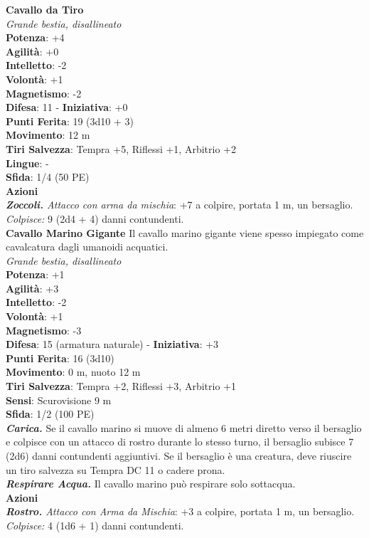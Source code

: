 \begin{multicols}{2}
\medskip\textbf{Cavallo da Tiro}\\
\emph{Grande bestia, disallineato}\\
\textbf{Potenza}: +4\\
\textbf{Agilità}: +0\\
\textbf{Intelletto}: -2\\
\textbf{Volontà}: +1\\
\textbf{Magnetismo}: -2\\
\textbf{Difesa}: 11 - \textbf{Iniziativa}: +0\\
\textbf{Punti Ferita}: 19 (3d10 + 3)\\
\textbf{Movimento}: 12 m\\
\textbf{Tiri Salvezza}:  Tempra +5, Riflessi +1, Arbitrio +2 \\
\textbf{Lingue}: -\\
\textbf{Sfida}: 1/4 (50 PE)\smallskip\\
\smallskip\textbf{Azioni}\\
\emph{\textbf{Zoccoli.} Attacco con arma da mischia}: +7 a colpire, portata 1 m, un bersaglio.\\
\emph{Colpisce:} 9 (2d4 + 4) danni contundenti.\\

\medskip\textbf{Cavallo Marino Gigante}
Il cavallo marino gigante viene spesso impiegato come cavalcatura dagli umanoidi acquatici.\\
\emph{Grande bestia, disallineato}\\
\textbf{Potenza}: +1\\
\textbf{Agilità}: +3\\
\textbf{Intelletto}: -2\\
\textbf{Volontà}: +1\\
\textbf{Magnetismo}: -3\\
\textbf{Difesa}: 15 (armatura naturale) - \textbf{Iniziativa}: +3\\
\textbf{Punti Ferita}: 16 (3d10)\\
\textbf{Movimento}: 0 m, nuoto 12 m\\
\textbf{Tiri Salvezza}: Tempra +2, Riflessi +3, Arbitrio +1 \\
\textbf{Sensi}: Scurovisione 9 m\\
\textbf{Sfida}: 1/2 (100 PE)\smallskip\\
\emph{\textbf{Carica.}} Se il cavallo marino si muove di almeno 6 metri diretto verso il bersaglio e colpisce con un attacco di rostro durante lo stesso turno, il bersaglio subisce 7 (2d6) danni contundenti aggiuntivi. Se il bersaglio è una creatura, deve riuscire un tiro salvezza su Tempra DC 11 o cadere prona.\\
\emph{\textbf{Respirare Acqua.}} Il cavallo marino può respirare solo sottacqua.\\
\smallskip\textbf{Azioni}\\
\emph{\textbf{Rostro.} Attacco con Arma da Mischia}: +3 a colpire, portata 1 m, un bersaglio.\\
\emph{Colpisce:} 4 (1d6 + 1) danni contundenti.\\


\end{multicols}
